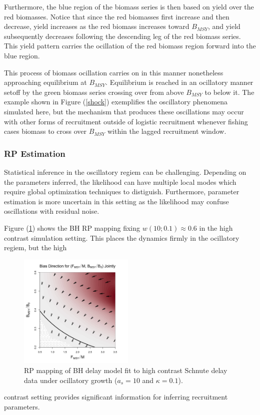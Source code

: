%
Furthermore, the blue region of the biomass series is then based on yield
over the red biomasses. Notice that since the red biomasses first increase and
then decrease, yield increases as the red biomass increases toward
$B_{MSY}$, and yield subsequently decreases following the descending leg
of the red biomass series. %
This yield pattern carries the ocillation of the red biomass region
forward into the blue region.

%
This process of biomass ocillation carries on in this manner nonetheless
approaching equilibrium at $B_{MSY}$. Equilibrium is reached in an ocillatory
manner setoff by the green biomass series crossing over from above $B_{MSY}$
to below it. The example shown in Figure (\ref{shock}) exemplifies the oscillatory 
phenomena simulated here, but the mechanism that produces these oscillations may
occur with other forms of recruitment outside of logistic recruitment whenever
fishing cases biomass to cross over $B_{MSY}$ within the lagged recruitment window.

%
\subsubsection{RP Estimation}

%
Statistical inference in the oscillatory regiem can be challenging. Depending on
the parameters inferred, the likelihood can have multiple local modes which
require global optimization techniques to distiguish. Furthermore, parameter
estimation is more uncertain in this setting as the likelihood may confuse
oscillations with residual noise.

%
Figure (\ref{ocillationArrow}) shows the BH RP mapping fixing $w(10;0.1)\approx0.6$
in the high contrast simulation setting. This places the dynamics firmly in the
ocillatory regiem, but the
high %
%
\begin{figure}
\vspace{-0.75cm}
\includegraphics[width=0.49\textwidth]{../ddBias/directionalBiasDDSubExpT45N300A0-1AS10K0.1.png}
\vspace{-0.95cm}
\caption{RP mapping of BH delay model fit to high contrast Schnute delay data under ocillatory growth ($a_s=10$ and $\kappa=0.1$).
}\label{ocillationArrow}
\end{figure}
contrast setting provides significant information for inferring recruitment parameters.

